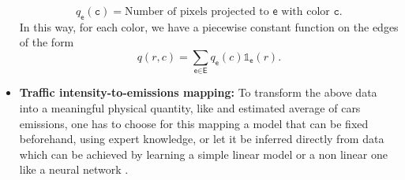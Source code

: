 \documentclass[11pt,a4paper,twoside]{article}
\theoremstyle{definition}
\numberwithin{equation}{section}
\newcommand{\E}{\ensuremath{\textsf{E}}} %
\newcommand{\ee}{\ensuremath{\textsf{e}}}
\newcommand{\<}{\langle}
\renewcommand{\>}{\rangle}
\newcommand{\asmodif}[2]{{\color{teal} #1} {\sout{#2}}}
\newcommand{\om}[1]{\textcolor{blue}{#1}}
\begin{document}
\begin{itemize}
{      $$
      q_\ee(\texttt{c}) = \text{Number of pixels projected to $\ee$ with color $\texttt{c}$}.
      $$
      }{}
      In this way, for each color, we have a piecewise constant function on the edges of the form
      \begin{equation}
      q(r,c)=\sum_{\ee\in \E} q_\ee(c) \mathds{1}_\ee(r).
      \label{eq:q}
      \end{equation}
      \item \textbf{Traffic intensity-to-emissions mapping:} \asmodif{To transform the above data into a meaningful physical quantity, like and estimated average of cars emissions, one has to choose for this mapping a model that can be fixed beforehand, using expert knowledge, or let it be inferred directly from data which can be achieved by learning a simple linear model or a non linear one like a neural network}{}.
      
      
\end{itemize}
\end{document}
